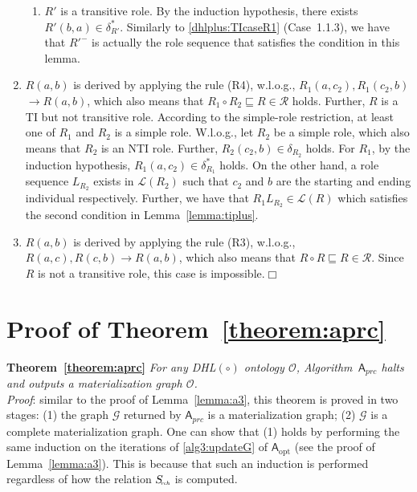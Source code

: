 \begin{enumerate}[leftmargin=12ex,label=Case~3.\arabic*, ref=Case~3.\arabic*]
\begin{enumerate}[leftmargin=8ex,label=Case~3.2.\arabic*]
     \item $R'$ is a transitive role.
        By the induction hypothesis, there exists $R'(b,a)\in\delta^*_{R'}$.
        Similarly to \ref{dhlplus:TIcaseR1} (Case~1.1.3), we have that
        $R'^-$ is actually the role sequence that satisfies the condition
        in this lemma.
    \end{enumerate}

\item $R(a,b)$ is derived by applying the rule (R4), w.l.o.g.,
    $R_1(a,c_2),R_1(c_2,b)$ $\rightarrow R(a,b)$,
    which also means that $R_1\circ R_2\sqsubseteq R\in\mathcal{R}$ holds.
    Further, $R$ is a TI but not transitive role. According to the simple-role restriction,
    at least one of $R_1$ and $R_2$ is a simple role.
    W.l.o.g., let $R_2$ be a simple role, which also
    means that $R_2$ is an NTI role. Further, $R_2(c_2,b)\in\delta_{R_2}$ holds.
    For $R_1$, by the induction hypothesis, $R_1(a,c_2)\in\delta^*_{R_1}$ holds.
    On the other hand, a role sequence $L_{R_2}$ exists in $\mathcal{L}(R_2)$ such that $c_2$ and $b$
    are the starting and ending individual respectively.
    Further, we have that $R_1L_{R_2}\in\mathcal{L}(R)$ which satisfies the second condition
    in Lemma~\ref{lemma:tiplus}.\label{dhlplus:TIcaseR4}

\item $R(a,b)$ is derived by applying the rule (R3), w.l.o.g., $R(a,c),R(c,b)\rightarrow R(a,b)$,
    which also means that $R\circ R\sqsubseteq R\in\mathcal{R}$.
    Since $R$ is not a transitive role, this case is impossible.\hfill$\Box$
\end{enumerate}

\section{Proof of Theorem~\ref{theorem:aprc}}

\textbf{Theorem~\ref{theorem:aprc}}
\emph{For any DHL$(\circ)$ ontology $\mathcal{O}$, Algorithm~$\mathsf{A}_{prc}$ halts and outputs
a materialization graph $\mathcal{O}$.}\\

\noindent\emph{Proof}: similar to the proof of Lemma~\ref{lemma:a3},
this theorem is proved in two stages:
(1) the graph $\mathcal{G}$ returned by $\mathsf{A}_{prc}$ is a materialization graph;
(2) $\mathcal{G}$ is a complete materialization graph.
One can show that (1) holds by performing the same induction on the iterations of \ref{alg3:updateG} of $\mathsf{A}_{\text{opt}}$
(see the proof of Lemma~\ref{lemma:a3}). This is because that
such an induction is performed regardless of how the relation $S_{\textit{\!\tiny rch}}$ is computed.

